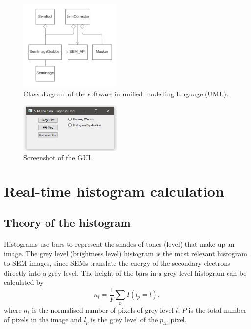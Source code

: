 \documentclass[12pt, twocolumn]{report}
\begin{document}
\begin{figure}[htbp]
    \centering
    \includegraphics[width=0.45\textwidth]{Figures/Software class diagram.png}
    \caption{Class diagram of the software in unified modelling language (UML).}
    \label{Software class diagram}
\end{figure}

\begin{figure}[htbp]
    \centering
    \includegraphics[width=0.45\textwidth]{Figures/Software screenshot.jpg}
    \caption{Screenshot of the GUI.}
    \label{Software GUI}
\end{figure}

\section{Real-time histogram calculation}
\subsection{Theory of the histogram}
\paragraph{}
Histograms use bars to represent the shades of tones (level) that make up an image. The grey level (brightness level) histogram is the most relevant histogram to SEM images, since SEMs translate the energy of the secondary electrons directly into a grey level. The height of the bars in a grey level histogram can be calculated by
\begin{equation}
    n_l = \frac{1}{P} \sum_{p} I(l_p=l),
\end{equation}
where $n_l$ is the normalised number of pixels of grey level $l$, $P$ is the total number of pixels in the image and $l_p$ is the grey level of the $p_{th}$ pixel. 
\end{document}
